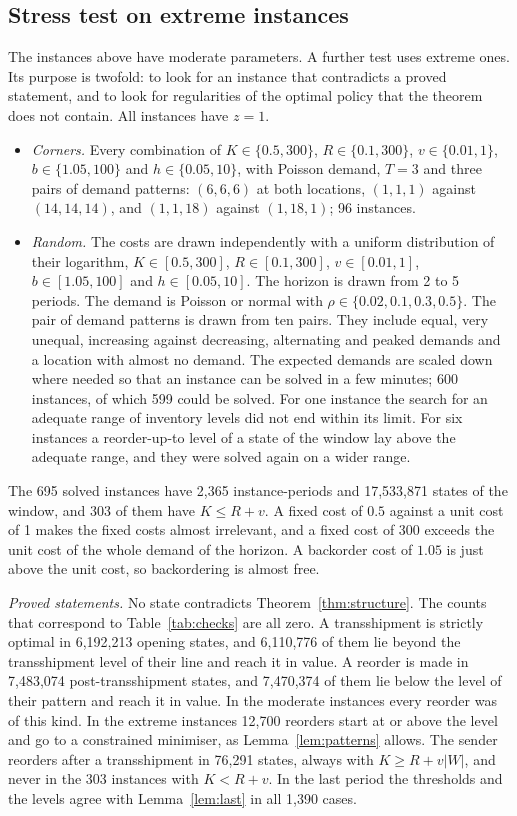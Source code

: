 \documentclass[11pt]{article}
\theoremstyle{definition}
\begin{document}
\subsection{Stress test on extreme instances}\label{sec:stress}

The instances above have moderate parameters. A further test uses extreme ones. Its purpose is twofold: to look for an instance that contradicts a proved statement, and to look for regularities of the optimal policy that the theorem does not contain. All instances have $z=1$.
\begin{itemize}
\item \emph{Corners.} Every combination of $K\in\{0.5,300\}$, $R\in\{0.1,300\}$, $v\in\{0.01,1\}$, $b\in\{1.05,100\}$ and $h\in\{0.05,10\}$, with Poisson demand, $T=3$ and three pairs of demand patterns: $(6,6,6)$ at both locations, $(1,1,1)$ against $(14,14,14)$, and $(1,1,18)$ against $(1,18,1)$; 96 instances.
\item \emph{Random.} The costs are drawn independently with a uniform distribution of their logarithm, $K\in[0.5,300]$, $R\in[0.1,300]$, $v\in[0.01,1]$, $b\in[1.05,100]$ and $h\in[0.05,10]$. The horizon is drawn from 2 to 5 periods. The demand is Poisson or normal with $\rho\in\{0.02,0.1,0.3,0.5\}$. The pair of demand patterns is drawn from ten pairs. They include equal, very unequal, increasing against decreasing, alternating and peaked demands and a location with almost no demand. The expected demands are scaled down where needed so that an instance can be solved in a few minutes; 600 instances, of which 599 could be solved. For one instance the search for an adequate range of inventory levels did not end within its limit. For six instances a reorder-up-to level of a state of the window lay above the adequate range, and they were solved again on a wider range.
\end{itemize}
The 695 solved instances have 2,365 instance-periods and 17,533,871 states of the window, and 303 of them have $K\le R+v$. A fixed cost of $0.5$ against a unit cost of 1 makes the fixed costs almost irrelevant, and a fixed cost of 300 exceeds the unit cost of the whole demand of the horizon. A backorder cost of $1.05$ is just above the unit cost, so backordering is almost free.

\emph{Proved statements.} No state contradicts Theorem~\ref{thm:structure}. The counts that correspond to Table~\ref{tab:checks} are all zero. A transshipment is strictly optimal in 6,192,213 opening states, and 6,110,776 of them lie beyond the transshipment level of their line and reach it in value. A reorder is made in 7,483,074 post-transshipment states, and 7,470,374 of them lie below the level of their pattern and reach it in value. In the moderate instances every reorder was of this kind. In the extreme instances 12,700 reorders start at or above the level and go to a constrained minimiser, as Lemma~\ref{lem:patterns} allows. The sender reorders after a transshipment in 76,291 states, always with $K\ge R+v|W|$, and never in the 303 instances with $K<R+v$. In the last period the thresholds and the levels agree with Lemma~\ref{lem:last} in all 1,390 cases.
\end{document}
